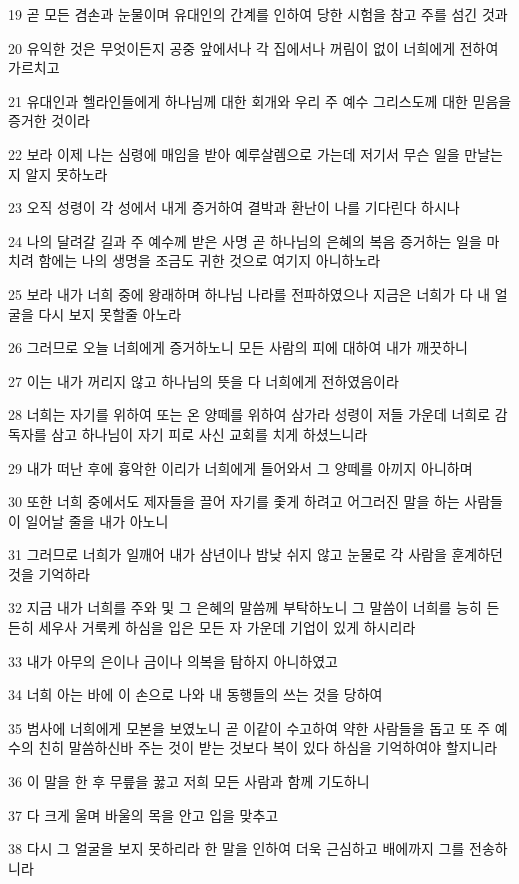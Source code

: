 \par 19 곧 모든 겸손과 눈물이며 유대인의 간계를 인하여 당한 시험을 참고 주를 섬긴 것과
\par 20 유익한 것은 무엇이든지 공중 앞에서나 각 집에서나 꺼림이 없이 너희에게 전하여 가르치고
\par 21 유대인과 헬라인들에게 하나님께 대한 회개와 우리 주 예수 그리스도께 대한 믿음을 증거한 것이라
\par 22 보라 이제 나는 심령에 매임을 받아 예루살렘으로 가는데 저기서 무슨 일을 만날는지 알지 못하노라
\par 23 오직 성령이 각 성에서 내게 증거하여 결박과 환난이 나를 기다린다 하시나
\par 24 나의 달려갈 길과 주 예수께 받은 사명 곧 하나님의 은혜의 복음 증거하는 일을 마치려 함에는 나의 생명을 조금도 귀한 것으로 여기지 아니하노라
\par 25 보라 내가 너희 중에 왕래하며 하나님 나라를 전파하였으나 지금은 너희가 다 내 얼굴을 다시 보지 못할줄 아노라
\par 26 그러므로 오늘 너희에게 증거하노니 모든 사람의 피에 대하여 내가 깨끗하니
\par 27 이는 내가 꺼리지 않고 하나님의 뜻을 다 너희에게 전하였음이라
\par 28 너희는 자기를 위하여 또는 온 양떼를 위하여 삼가라 성령이 저들 가운데 너희로 감독자를 삼고 하나님이 자기 피로 사신 교회를 치게 하셨느니라
\par 29 내가 떠난 후에 흉악한 이리가 너희에게 들어와서 그 양떼를 아끼지 아니하며
\par 30 또한 너희 중에서도 제자들을 끌어 자기를 좇게 하려고 어그러진 말을 하는 사람들이 일어날 줄을 내가 아노니
\par 31 그러므로 너희가 일깨어 내가 삼년이나 밤낮 쉬지 않고 눈물로 각 사람을 훈계하던 것을 기억하라
\par 32 지금 내가 너희를 주와 및 그 은혜의 말씀께 부탁하노니 그 말씀이 너희를 능히 든든히 세우사 거룩케 하심을 입은 모든 자 가운데 기업이 있게 하시리라
\par 33 내가 아무의 은이나 금이나 의복을 탐하지 아니하였고
\par 34 너희 아는 바에 이 손으로 나와 내 동행들의 쓰는 것을 당하여
\par 35 범사에 너희에게 모본을 보였노니 곧 이같이 수고하여 약한 사람들을 돕고 또 주 예수의 친히 말씀하신바 주는 것이 받는 것보다 복이 있다 하심을 기억하여야 할지니라
\par 36 이 말을 한 후 무릎을 꿇고 저희 모든 사람과 함께 기도하니
\par 37 다 크게 울며 바울의 목을 안고 입을 맞추고
\par 38 다시 그 얼굴을 보지 못하리라 한 말을 인하여 더욱 근심하고 배에까지 그를 전송하니라

